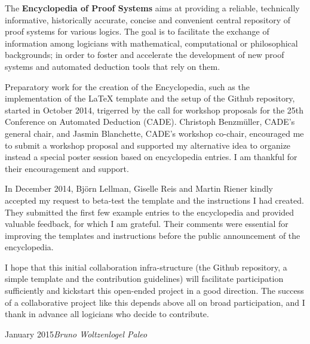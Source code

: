 
\preface

The \textbf{Encyclopedia of Proof Systems} aims at providing a reliable, technically informative, historically accurate, concise and convenient central repository of proof systems for various logics. The goal is to facilitate the exchange of information among logicians with mathematical, computational or philosophical backgrounds; in order to foster and accelerate the development of new proof systems and automated deduction tools that rely on them.

Preparatory work for the creation of the Encyclopedia, such as the implementation of the LaTeX template and the setup of the Github repository, started in October 2014, trigerred by the call for workshop proposals for the 25th Conference on Automated Deduction (CADE). Christoph Benzm\"uller, CADE's general chair, and Jasmin Blanchette, CADE's workshop co-chair, encouraged me to submit a workshop proposal and supported my alternative idea to organize instead a special poster session based on encyclopedia entries. I am thankful for their encouragement and support.

In December 2014, Bj\"orn Lellman, Giselle Reis and Martin Riener kindly accepted my request to beta-test the template and the instructions I had created. They submitted the first few example entries to the encyclopedia and provided valuable feedback, for which I am grateful. Their comments were essential for improving the templates and instructions before the public announcement of the encyclopedia.

I hope that this initial collaboration infra-structure (the Github repository, a simple template and the contribution guidelines) will facilitate participation sufficiently and kickstart this open-ended project in a good direction. The success of a collaborative project like this depends above all on broad participation, and I thank in advance all logicians who decide to contribute.
 

\vspace{\baselineskip}
\begin{flushright}\noindent
January 2015\hfill {\it Bruno Woltzenlogel Paleo}
\end{flushright}


